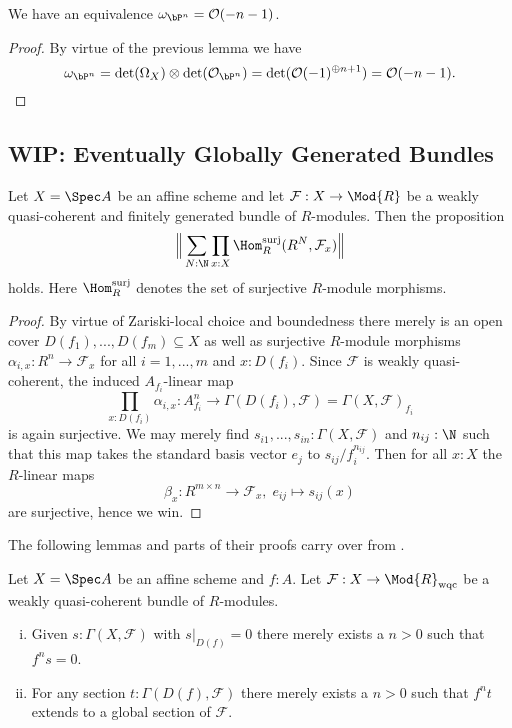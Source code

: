 \begin{corollary}\label{canonical-bundle-as-twist}
  We have an equivalence $\omega_{\bP^n} = \mathcal O(-n-1)$.
\end{corollary}

\begin{proof}
  By virtue of the previous lemma we have
  \[
    \omega_{\bP^n} = \det(\Omega_X) \otimes \det(\mathcal O_{\bP^n}) = \det(\mathcal O(-1)^{\oplus n+1}) = \mathcal O (-n-1).
  \]
\end{proof}

\subsection{WIP: Eventually Globally Generated Bundles}


\begin{lemma}
  \label{wqc+fg-bundle-is-explicitly-generated}
  Let $X=\Spec A$ be an affine scheme and let $\mathcal F : X \to \Mod{R}$ be a weakly quasi-coherent and finitely generated bundle of $R$-modules.
  Then the proposition
  \[
    \Big\Vert
      \sum_{N:\N}\prod_{x:X}\Hom_R^\mathrm{surj}(R^N,\mathcal F_x)
    \Big\Vert
  \]
  holds. Here $\Hom_R^\mathrm{surj}$ denotes the set of surjective $R$-module morphisms.
\end{lemma}

\begin{proof}
  By virtue of Zariski-local choice and boundedness there merely is an open cover $D(f_1), ..., D(f_m) \subseteq X$ as well as surjective $R$-module morphisms $\alpha_{i,x} : R^n \to \mathcal F_x$ for all $i=1, ..., m$ and $x:D(f_i)$.
  Since $\mathcal F$ is weakly quasi-coherent, the induced $A_{f_i}$-linear map
  \[
    \textstyle\prod_{x:D(f_i)}\alpha_{i,x} :  A_{f_i}^n \longrightarrow \Gamma (D(f_i),\mathcal F) = \Gamma (X,\mathcal F)_{f_i}
  \]
  is again surjective. We may merely find $s_{i1}, ..., s_{in}:\Gamma (X,\mathcal F)$ and $n_{ij}:\N$ such that this map takes the standard basis vector $e_j$ to $s_{ij}/f_i^{n_{ij}}$.
  Then for all $x:X$ the $R$-linear maps
  \[
    \beta_x : R^{m \times n} \longrightarrow \mathcal F_x, \;
    e_{ij} \longmapsto s_{ij}(x)
  \]
  are surjective, hence we win.
\end{proof}

The following lemmas and parts of their proofs carry over from \cite[Chapter II.5]{Hartshorne}.

\begin{lemma}
  \label{affine-extension-of-sections}
  Let $X = \Spec A$ be an affine scheme and $f:A$.
  Let $\mathcal F:X\to \Mod{R}_{\mathrm{wqc}}$ be a weakly quasi-coherent bundle of $R$-modules.
  \begin{enumerate}[(i)]
    \item Given $s:\Gamma (X,\mathcal F)$ with $s|_{D(f)} = 0$  there merely exists a $n>0$ such that $f^ns=0$.
    \item For any section $t:\Gamma(D(f),\mathcal F)$ there merely exists a $n>0$
      such that $f^nt$ extends to a global section of $\mathcal F$.
  \end{enumerate}
\end{lemma}

